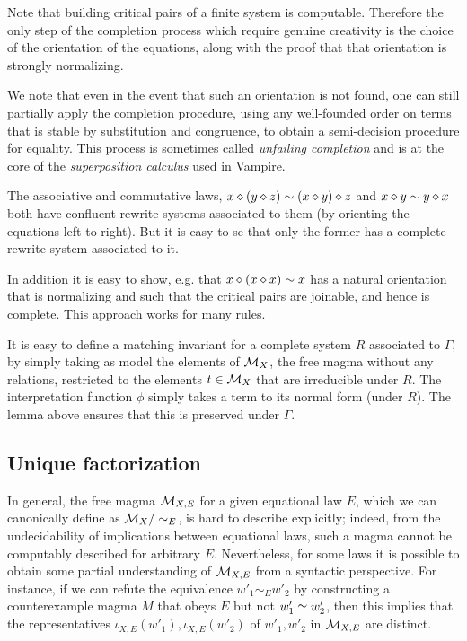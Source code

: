 Note that building critical pairs of a finite system is computable. Therefore the only step of the completion process which require genuine creativity is the choice of the orientation of the equations, along with the proof that that orientation is strongly normalizing.

We note that even in the event that such an orientation is not found, one can still partially apply the completion procedure, using any well-founded order on terms that is stable by substitution and congruence, to obtain a semi-decision procedure for equality. This process is sometimes called \emph{unfailing completion} and is at the core of the \emph{superposition calculus} used in Vampire.



The associative and commutative laws, $x \diamond (y \diamond z) \sim (x \diamond y) \diamond z$ and $x \diamond y \sim y \diamond x$ both have confluent rewrite systems associated to them (by orienting the equations left-to-right). But it is easy to se that only the former has a complete rewrite system associated to it.

In addition it is easy to show, e.g. that $x \diamond (x \diamond x) \sim x$ has a natural orientation that is normalizing and such that the critical pairs are joinable, and hence is complete. This approach works for many rules.

It is easy to define a matching invariant for a complete system $R$ associated to $\Gamma$, by simply taking as model the elements of ${\mathcal{M}}_{X}$, the free magma without any relations, restricted to the elements $t \in {\mathcal{M}}_{X}$ that are irreducible under $R$. The interpretation function $\phi$ simply takes a term to its normal form (under $R$). The lemma above ensures that this is preserved under $\Gamma$.

\subsection{Unique factorization}

In general, the free magma ${\mathcal{M}}_{X,E}$ for a given equational law $E$, which we can canonically define as ${\mathcal{M}}_X / \sim_E$, is hard to describe explicitly; indeed, from the undecidability of implications between equational laws, such a magma cannot be computably described for arbitrary $E$.  Nevertheless, for some laws it is possible to obtain some partial understanding of ${\mathcal{M}}_{X,E}$ from a syntactic perspective.  For instance, if we can refute the equivalence $w'_1 \sim_E w'_2$ by constructing a counterexample magma $M$ that obeys $E$ but not $w'_1 \simeq w'_2$, then this implies that the representatives $\iota_{X,E}(w'_1), \iota_{X,E}(w'_2)$ of  $w'_1, w'_2$ in ${\mathcal{M}}_{X,E}$ are distinct.

